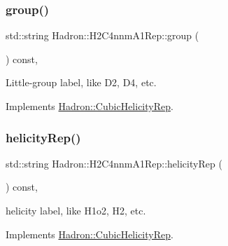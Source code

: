 \mbox{\label{structHadron_1_1H2C4nnmA1Rep_a857a824d79d2b5d7bf3b4e4641f171cb}} 
\subsubsection{\texorpdfstring{group()}{group()}\hspace{0.1cm}{\footnotesize\ttfamily [5/5]}}
{\footnotesize\ttfamily std\+::string Hadron\+::\+H2\+C4nnm\+A1\+Rep\+::group (\begin{DoxyParamCaption}{ }\end{DoxyParamCaption}) const\hspace{0.3cm}{\ttfamily [inline]}, {\ttfamily [virtual]}}

Little-\/group label, like D2, D4, etc. 

Implements \mbox{\hyperlink{structHadron_1_1CubicHelicityRep_a101a7d76cd8ccdad0f272db44b766113}{Hadron\+::\+Cubic\+Helicity\+Rep}}.

\mbox{\label{structHadron_1_1H2C4nnmA1Rep_a383c3c921c06e12e6ad53f2acb09bda1}} 
\subsubsection{\texorpdfstring{helicityRep()}{helicityRep()}\hspace{0.1cm}{\footnotesize\ttfamily [1/3]}}
{\footnotesize\ttfamily std\+::string Hadron\+::\+H2\+C4nnm\+A1\+Rep\+::helicity\+Rep (\begin{DoxyParamCaption}{ }\end{DoxyParamCaption}) const\hspace{0.3cm}{\ttfamily [inline]}, {\ttfamily [virtual]}}

helicity label, like H1o2, H2, etc. 

Implements \mbox{\hyperlink{structHadron_1_1CubicHelicityRep_af1096946b7470edf0a55451cc662f231}{Hadron\+::\+Cubic\+Helicity\+Rep}}.

\mbox{\label{structHadron_1_1H2C4nnmA1Rep_a383c3c921c06e12e6ad53f2acb09bda1}} 
